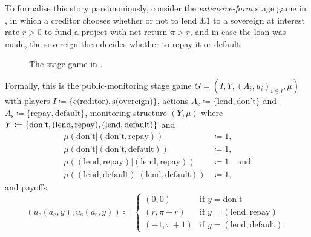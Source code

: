 \begin{example}
	To formalise this story parsimoniously, consider the \emph{extensive-form} stage game in , in which a creditor chooses whether or not to lend £1 to a sovereign at interest rate $r>0$ to fund a project with net return $\pi>r$, and in case the loan was made, the sovereign then decides whether to repay it or default.
	\begin{figure}
		\centering
		\usetikzlibrary{trees, arrows.meta, positioning}
		\caption{The stage game in .}
		\label{fig:sov}
	\end{figure}
	Formally, this is the public-monitoring stage game $G = \left( I, Y, (A_i, u_i)_{i \in I}, \mu \right)$ with players $I \coloneqq \{\text{c(reditor)},\text{s(overeign)}\}$, actions $A_{\text{c}} \coloneqq \{\text{lend},\text{don't}\}$ and $A_{\text{s}} \coloneqq \{\text{repay},\text{default}\}$, monitoring structure $(Y,\mu)$ where $Y \coloneqq \text\{ \text{don't}, (\text{lend},\text{repay}), (\text{lend},\text{default}) \}$ and 
	\begin{align*}
		\mu(\text{don't}|(\text{don't},\text{repay}))
		&\coloneqq 1 ,
		\\
		\mu(\text{don't}|(\text{don't},\text{default}))
		&\coloneqq 1 ,
		\\
		\mu((\text{lend},\text{repay})|(\text{lend},\text{repay}))
		&\coloneqq 1
		\quad \text{and}
		\\
		\mu((\text{lend},\text{default})|(\text{lend},\text{default}))
		&\coloneqq 1 ,
	\end{align*}
	and payoffs
	\begin{equation*}
		\left( u_{\text{c}}(a_{\text{c}},y) ,
		u_{\text{s}}(a_{\text{s}},y) \right)
		\coloneqq
		\begin{cases}
			(0,0) & \text{if $y = \text{don't}$} \\
			(r,\pi - r) & \text{if $y = (\text{lend},\text{repay})$} \\
			(-1,\pi + 1) & \text{if $y = (\text{lend},\text{default})$.}
		\end{cases}
	\end{equation*}


\end{example}

